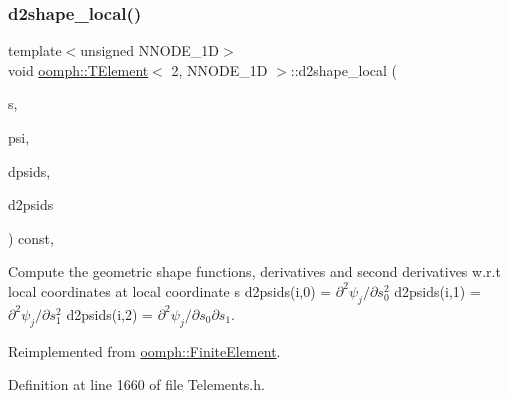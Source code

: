 \subsubsection{\texorpdfstring{d2shape\+\_\+local()}{d2shape\_local()}}
{\footnotesize\ttfamily template$<$unsigned N\+N\+O\+D\+E\+\_\+1D$>$ \\
void \hyperlink{classoomph_1_1TElement}{oomph\+::\+T\+Element}$<$ 2, N\+N\+O\+D\+E\+\_\+1D $>$\+::d2shape\+\_\+local (\begin{DoxyParamCaption}\item[{const \hyperlink{classoomph_1_1Vector}{Vector}$<$ double $>$ \&}]{s,  }\item[{\hyperlink{classoomph_1_1Shape}{Shape} \&}]{psi,  }\item[{\hyperlink{classoomph_1_1DShape}{D\+Shape} \&}]{dpsids,  }\item[{\hyperlink{classoomph_1_1DShape}{D\+Shape} \&}]{d2psids }\end{DoxyParamCaption}) const\hspace{0.3cm}{\ttfamily [inline]}, {\ttfamily [virtual]}}



Compute the geometric shape functions, derivatives and second derivatives w.\+r.\+t local coordinates at local coordinate s d2psids(i,0) = $ \partial^2 \psi_j / \partial s_0^2 $ d2psids(i,1) = $ \partial^2 \psi_j / \partial s_1^2 $ d2psids(i,2) = $ \partial^2 \psi_j / \partial s_0 \partial s_1 $. 



Reimplemented from \hyperlink{classoomph_1_1FiniteElement_a53e5051582d9da07b9d35da9debd0cd7}{oomph\+::\+Finite\+Element}.



Definition at line 1660 of file Telements.\+h.

\mbox{\label{classoomph_1_1TElement_3_012_00_01NNODE__1D_01_4_a9b72261d8b53fa87f530653293163004}} 
